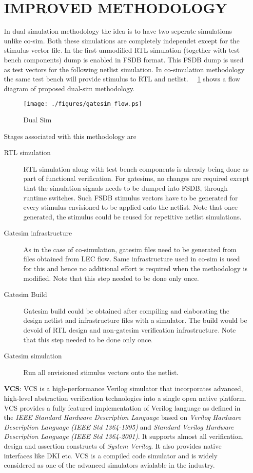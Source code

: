 \section {IMPROVED METHODOLOGY}
\label{sec:dualsim:im}
In dual simulation methodology the idea is to have two seperate simulations unlike co-sim. Both these simulations are completely independet except for the stimulus vector file. In the first unmodified RTL simulation (together with test bench components) dump is enabled in FSDB format. This FSDB dump is used as test vectors for the following netlist simulation. In co-simulation methodology the same test bench will provide stimulus to RTL and netlist. ~\figurename{~\ref{fig:gatesim_flow.ps}} shows a flow diagram of proposed dual-sim methodology.  
\begin{figure}[h]
\centering
\texttt{[image: ./figures/gatesim\_flow.ps]}
\caption{Dual Sim}
\label{fig:gatesim_flow.ps}
\end{figure}

Stages associated with this methodology are
\begin{description}
	\item[RTL simulation] RTL simulation along with test bench components is already being done as part of functional verification. For gatesims, no changes are required except that the simulation signals needs to be dumped into FSDB, through runtime switches. Such FSDB stimulus vectors have to be generated for every stimulus envisioned to be applied onto the netlist. Note that once generated, the stimulus could be reused for repetitive netlist simulations.
	\item[Gatesim infrastructure] As in the case of co-simulation, gatesim files need to be generated from files obtained from LEC flow. Same infrastructure used in co-sim is used for this and hence no additional effort is required when the methodology is modified. Note that this step needed to be done only once.
	\item[Gatesim Build] Gatesim build could be obtained after compiling and elaborating the design netlist and infrastructure files with a simulator. The build would be devoid of RTL design and non-gatesim verification infrastructure. Note that this step needed to be done only once.
	\item[Gatesim simulation] Run all envisioned stimulus vectors onto the netlist.
\end{description}


{\bf VCS}: VCS is a high-performance Verilog simulator that  incorporates advanced, high-level abstraction verification  technologies into a single open native platform. VCS provides a fully featured implementation of Verilog language as defined in the {\it IEEE Standard Hardware Description Language} based on {\it Verilog Hardware Description Language (IEEE Std 1364-1995)} and {\it Standard Verilog Hardware Description Language (IEEE Std 1364-2001)}. It supports almost all verification, design and assertion constructs of {\it System Verilog}. It also provides native interfaces like DKI etc. VCS is a compiled code simulator and is widely considered as one of the advanced simulators avialable in the industry.

